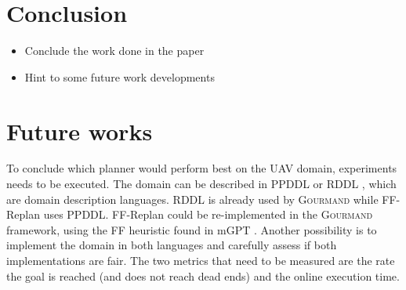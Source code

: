 \documentclass[runningheads,a4paper]{llncs}
\begin{document}
%
%
%




\section{Conclusion}

\begin{itemize}
	\item Conclude the work done in the paper
	\item Hint to some future work developments
\end{itemize}


\section{Future works}

To conclude which planner would perform best on the UAV domain, experiments
needs to be executed. The domain can be described in PPDDL
\cite{younes2004ppddl1} or RDDL \cite{Sanner:RDDL}, which are domain
description languages. RDDL is already used by \textsc{Gourmand} while
FF-Replan uses PPDDL\@. FF-Replan could be re-implemented in the
\textsc{Gourmand} framework, using the FF heuristic found in mGPT
\cite{bonet2011planning}. Another possibility is to implement the domain in
both languages and carefully assess if both implementations are fair.  The two
metrics that need to be measured are the rate the goal is reached (and does not
reach dead ends) and the online execution time.



\end{document}
